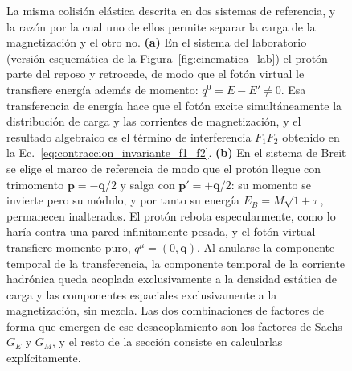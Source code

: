 \documentclass[10pt,a4paper]{article}
\begin{document}
\begin{figure}[t]
\begin{tikzpicture}[>=stealth, line width=0.7pt, font=\small]
\end{tikzpicture}
\caption{La misma colisión elástica descrita en dos sistemas de referencia, y la razón por la cual uno de ellos permite separar la carga de la magnetización y el otro no. \textbf{(a)} En el sistema del laboratorio (versión esquemática de la Figura~\ref{fig:cinematica_lab}) el protón parte del reposo y retrocede, de modo que el fotón virtual le transfiere energía además de momento: $q^0 = E - E' \neq 0$. Esa transferencia de energía hace que el fotón excite simultáneamente la distribución de carga y las corrientes de magnetización, y el resultado algebraico es el término de interferencia $F_1F_2$ obtenido en la Ec.~\eqref{eq:contraccion_invariante_f1_f2}. \textbf{(b)} En el sistema de Breit se elige el marco de referencia de modo que el protón llegue con trimomento $\mathbf{p} = -\mathbf{q}/2$ y salga con $\mathbf{p}' = +\mathbf{q}/2$: su momento se invierte pero su módulo, y por tanto su energía $E_B = M\sqrt{1+\tau}$, permanecen inalterados. El protón rebota especularmente, como lo haría contra una pared infinitamente pesada, y el fotón virtual transfiere momento puro, $q^\mu = (0,\mathbf{q})$. Al anularse la componente temporal de la transferencia, la componente temporal de la corriente hadrónica queda acoplada exclusivamente a la densidad estática de carga y las componentes espaciales exclusivamente a la magnetización, sin mezcla. Las dos combinaciones de factores de forma que emergen de ese desacoplamiento son los factores de Sachs $G_E$ y $G_M$, y el resto de la sección consiste en calcularlas explícitamente.}
\label{fig:marco_breit}
\end{figure}
\end{document}

